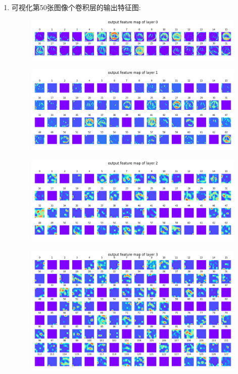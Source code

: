 \documentclass[a4paper]{article}
\begin{document}
\begin{enumerate}
\begin{enumerate}
        \item 可视化第50张图像个卷积层的输出特征图:
        \begin{figure}[H]
            \centering
            \includegraphics[width=0.65\linewidth]{../result/4_feature_layer0.png}
            \caption{}
        \end{figure}
        \begin{figure}[H]
            \centering
            \includegraphics[width=0.65\linewidth]{../result/4_feature_layer1.png}
            \caption{}
        \end{figure}
        \begin{figure}[H]
            \centering
            \includegraphics[width=0.65\linewidth]{../result/4_feature_layer2.png}
            \caption{}
        \end{figure}
        \begin{figure}[H]
            \centering
            \includegraphics[width=0.65\linewidth]{../result/4_feature_layer3.png}
            \caption{}
        \end{figure}

\end{enumerate}
\end{enumerate}
\end{document}
